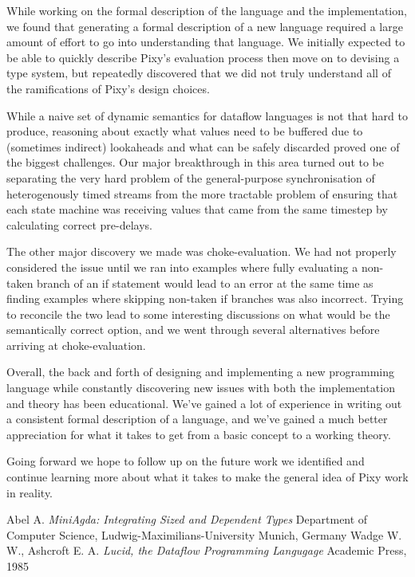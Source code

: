 \documentclass{scrartcl}
\begin{document}
    While working on the formal description of the language and the implementation, we found that generating a formal description of a new language required a large amount of effort to go into understanding that language. We initially expected to be able to quickly describe Pixy's evaluation process then move on to devising a type system, but repeatedly discovered that we did not truly understand all of the ramifications of Pixy's design choices.
    
    While a naive set of dynamic semantics for dataflow languages is not that hard to produce, reasoning about exactly what values need to be buffered due to (sometimes indirect) lookaheads and what can be safely discarded proved one of the biggest challenges. Our major breakthrough in this area turned out to be separating the very hard problem of the general-purpose synchronisation of heterogenously timed streams from the more tractable problem of ensuring that each state machine was receiving values that came from the same timestep by calculating correct pre-delays.
    
    The other major discovery we made was choke-evaluation. We had not properly considered the issue until we ran into examples where fully evaluating a non-taken branch of an if statement would lead to an error at the same time as finding examples where skipping non-taken if branches was also incorrect. Trying to reconcile the two lead to some interesting discussions on what would be the semantically correct option, and we went through several alternatives before arriving at choke-evaluation.
    
    Overall, the back and forth of designing and implementing a new programming language while constantly discovering new issues with both the implementation and theory has been educational. We've gained a lot of experience in writing out a consistent formal description of a language, and we've gained a much better appreciation for what it takes to get from a basic concept to a working theory.
    
    Going forward we hope to follow up on the future work we identified and continue learning more about what it takes to make the general idea of Pixy work in reality.
    
    \begin{thebibliography}{9}
        Abel A.
        \textit{MiniAgda: Integrating Sized and Dependent Types}
        Department of Computer Science,
        Ludwig-Maximilians-University Munich, Germany
        Wadge W. W.,
        Ashcroft E. A.
        \textit{Lucid, the Dataflow Programming Langugage}
        Academic Press, 1985
    \end{thebibliography}
    
\end{document}
